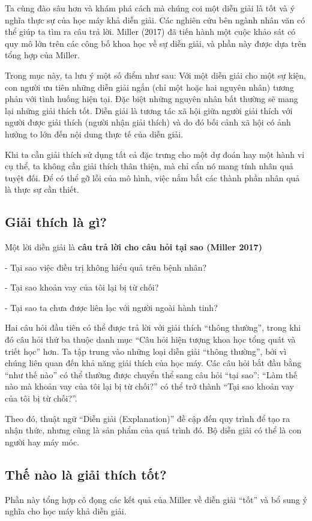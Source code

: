 Ta cùng đào sâu hơn và khám phá cách mà chúng coi một diễn giải là tốt và ý nghĩa thực sự của học máy khả diễn giải. Các nghiên cứu bên ngành nhân văn có thể giúp ta tìm ra câu trả lời. Miller (2017) đã tiến hành một cuộc khảo sát có quy mô lớn trên các công bố khoa học về sự diễn giải, và phần này được dựa trên tổng hợp của Miller.

Trong mục này, ta lưu ý một số điểm như sau: Với một diễn giải cho một sự kiện, con người ưu tiên những diễn giải ngắn (chỉ một hoặc hai nguyên nhân) tương phản với tình huống hiện tại. Đặc biệt những nguyên nhân bất thường sẽ mang lại những giải thích tốt. Diễn giải là tương tác xã hội giữa người giải thích với người được giải thích (người nhận giải thích) và do đó bối cảnh xã hội có ảnh hưởng to lớn đến nội dung thực tế của diễn giải.

Khi ta cần giải thích sử dụng tất cả đặc trưng cho một dự đoán hay một hành vi cụ thể, ta không cần giải thích thân thiện, mà chỉ cẩn nó mang tính nhân quả tuyệt đối. Để có thể gỡ lỗi của mô hình, việc nắm bắt các thành phần nhân quả là thực sự cần thiết.

\subsection{Giải thích là gì?}
Một lời diễn giải là \textbf{câu trả lời cho câu hỏi tại sao (Miller 2017)}

- Tại sao việc điều trị không hiểu quả trên bệnh nhân?

- Tại sao khoản vay của tôi lại bị từ chối?

- Tại sao ta chưa được liên lạc với người ngoài hành tinh?

Hai câu hỏi đầu tiên có thể được trả lời với giải thích ``thông thường'', trong khi đó câu hỏi thứ ba thuộc danh mục ``Câu hỏi hiện tượng khoa học tổng quát và triết học'' hơn. Ta tập trung vào những loại diễn giải ``thông thường'', bởi vì chúng liên quan đến khả năng giải thích của học máy. Các câu hỏi bắt đầu bằng ``như thế nào'' có thể thường được chuyển thể sang câu hỏi ``tại sao'': ``Làm thế nào mà khoản vay của tôi lại bị từ chối?'' có thể trở thành ``Tại sao khoản vay của tôi bị từ chối?''.

Theo đó, thuật ngữ ``Diễn giải (Explanation)'' đề cập đến quy trình để tạo ra nhận thức, nhưng cũng là sản phẩm của quá trình đó. Bộ diễn giải có thể là con người hay máy móc.

\subsection{Thế nào là giải thích tốt?}
Phần này tổng hợp cô đọng các kết quả của Miller về  diễn giải ``tốt'' và bổ sung ý nghĩa cho học máy khả diễn giải.

